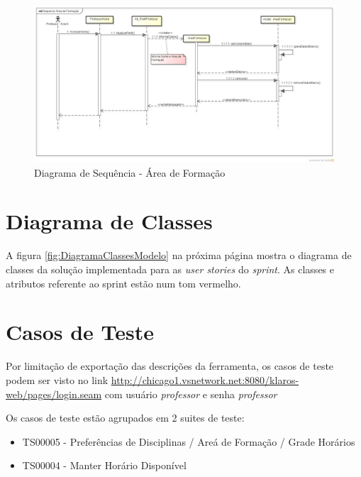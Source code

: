 \documentclass{abnt}
\begin{document}
\begin{landscape}
	\clearpage
		\begin{figure}[h]
		\begin{center}
			\includegraphics[width=650px]{SequenceAreaFormacao}
			\caption{Diagrama de Sequência -  Área de Formação}
			\label{fig:SequenceAreaFormacao}
			\end{center}
		\end{figure}
		\FloatBarrier
	\end{landscape}	
	\clearpage
	
	
		\section{Diagrama de Classes}
		
			A figura \ref{fig:DiagramaClassesModelo} na próxima página mostra o diagrama de classes da solução implementada para as \emph{user stories} do \emph{sprint}. As classes e atributos referente ao sprint estão num tom vermelho.
			
	
		\section{Casos de Teste}
		
		 Por limitação de exportação das descrições da ferramenta, os casos de teste podem ser visto no link \url{http://chicago1.vsnetwork.net:8080/klaros-web/pages/login.seam} com usuário \emph{professor} e senha \emph{professor}
		 
		 Os casos de teste estão agrupados em 2 suites de teste:
		 \begin{itemize}
		 \item TS00005 - Preferências de Disciplinas / Areá de Formação / Grade Horários
		 \item TS00004 - Manter Horário Disponível
		 \end{itemize}
		 
\end{document}
